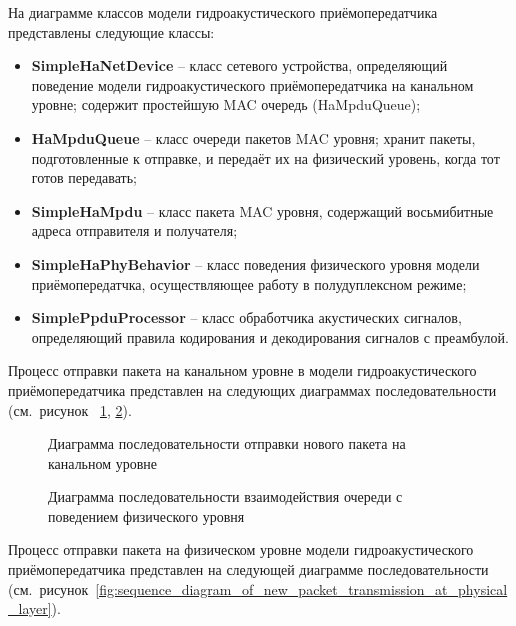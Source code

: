 \documentclass[
    numbers=section,
    document-code={ВКРБ--09.03.04--10.19--XX--26--81}
]{../latex/fqw}
\begin{document}
    На диаграмме классов модели гидроакустического приёмопередатчика представлены следующие классы:

    \begin{itemize}
        \item \textbf{SimpleHaNetDevice} -- класс сетевого устройства,
        определяющий поведение модели гидроакустического приёмопередатчика на канальном уровне;
        содержит простейшую MAC очередь (HaMpduQueue);
        \item \textbf{HaMpduQueue} -- класс очереди пакетов MAC уровня;
        хранит пакеты, подготовленные к отправке, и передаёт их на физический уровень, когда тот готов передавать;
        \item \textbf{SimpleHaMpdu} -- класс пакета MAC уровня, содержащий восьмибитные адреса отправителя и получателя;
        \item \textbf{SimpleHaPhyBehavior} -- класс поведения физического уровня модели приёмопередатчка,
        осуществляющее работу в полудуплексном режиме;
        \item \textbf{SimplePpduProcessor} -- класс обработчика акустических сигналов,
        определяющий правила кодирования и декодирования сигналов с преамбулой.
    \end{itemize}

    Процесс отправки пакета на канальном уровне в модели гидроакустического приёмопередатчика представлен
    на следующих диаграммах последовательности
    (см.~рисунок
    ~\ref{fig:sequence_diagram_of_new_packet_transmission_at_data_link_layer},
    \ref{fig:sequence_diagram_of_queue_interfacing_with_physical_layer_behavior}).

    \begin{figure}[H]
        \centering
        \fbox{\rule{0pt}{20mm}\rule{40mm}{0pt}}
        \caption{Диаграмма последовательности отправки нового пакета на канальном уровне}
        \label{fig:sequence_diagram_of_new_packet_transmission_at_data_link_layer}
    \end{figure}
    \begin{figure}[H]
        \centering
        \fbox{\rule{0pt}{20mm}\rule{40mm}{0pt}}
        \caption{Диаграмма последовательности взаимодействия очереди с поведением физического уровня}
        \label{fig:sequence_diagram_of_queue_interfacing_with_physical_layer_behavior}
    \end{figure}

    Процесс отправки пакета на физическом уровне модели гидроакустического приёмопередатчика представлен
    на следующей диаграмме последовательности
    (см.~рисунок~\ref{fig:sequence_diagram_of_new_packet_transmission_at_physical_layer}).
\end{document}
